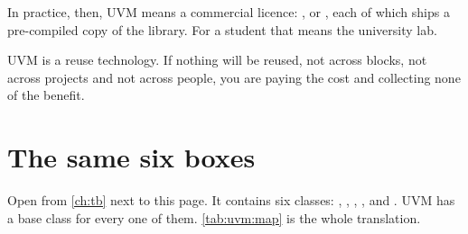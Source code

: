 In practice, then, UVM means a commercial licence: ,
 or , each of which ships a pre-compiled copy of the
library. For a student that means the university lab.

\begin{ruleofthumb}
UVM is a reuse technology. If nothing will be reused, not across blocks, not
across projects and not across people, you are paying the cost and collecting
none of the benefit.
\end{ruleofthumb}

\section{The same six boxes}
\label{sec:uvm:map}

Open  from \cref{ch:tb} next to this page. It
contains six classes: , ,
, ,  and
. UVM has a base class for every one of them.
\cref{tab:uvm:map} is the whole translation.

